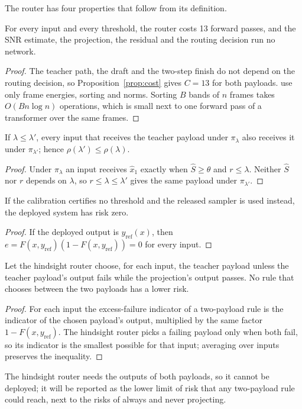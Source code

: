 The router has four properties that follow from its definition.

\begin{proposition}\label{prop:zero}
For every input and every threshold, the router costs 13 forward passes, and the SNR estimate, the projection, the residual and the routing decision run no network.
\end{proposition}
\begin{proof}
The teacher path, the draft and the two-step finish do not depend on the routing decision, so Proposition~\ref{prop:cost} gives $C=13$ for both payloads.  use only frame energies, sorting and norms. Sorting $B$ bands of $n$ frames takes $O(Bn\log n)$ operations, which is small next to one forward pass of a transformer over the same frames.
\end{proof}

\begin{proposition}\label{prop:mono}
If $\lambda\le\lambda'$, every input that receives the teacher payload under $\pi_\lambda$ also receives it under $\pi_{\lambda'}$; hence $\rho(\lambda')\le\rho(\lambda)$.
\end{proposition}
\begin{proof}
Under $\pi_\lambda$ an input receives $\hat x_1$ exactly when $\hat S\ge\theta$ and $r\le\lambda$. Neither $\hat S$ nor $r$ depends on $\lambda$, so $r\le\lambda\le\lambda'$ gives the same payload under $\pi_{\lambda'}$.
\end{proof}

\begin{proposition}\label{prop:fallback}
If the calibration certifies no threshold and the released sampler is used instead, the deployed system has risk zero.
\end{proposition}
\begin{proof}
If the deployed output is $y_{\text{ref}}(x)$, then $e=F(x,y_{\text{ref}})(1-F(x,y_{\text{ref}}))=0$ for every input.
\end{proof}

\begin{proposition}\label{prop:oracle}
Let the hindsight router choose, for each input, the teacher payload unless the teacher payload's output fails while the projection's output passes. No rule that chooses between the two payloads has a lower risk.
\end{proposition}
\begin{proof}
For each input the excess-failure indicator of a two-payload rule is the indicator of the chosen payload's output, multiplied by the same factor $1-F(x,y_{\text{ref}})$. The hindsight router picks a failing payload only when both fail, so its indicator is the smallest possible for that input; averaging over inputs preserves the inequality.
\end{proof}
The hindsight router needs the outputs of both payloads, so it cannot be deployed; it will be reported as the lower limit of risk that any two-payload rule could reach, next to the risks of always and never projecting.

